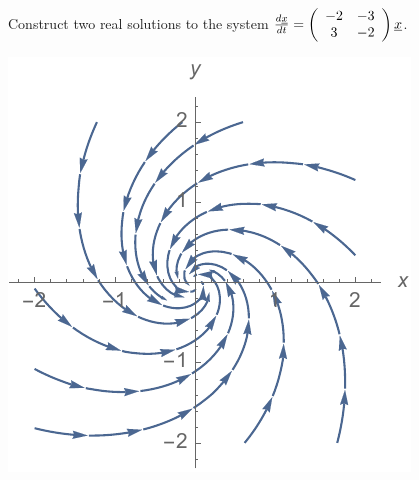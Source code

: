 \documentclass[12pt,letterpaper,noanswers]{exam}
\begin{document}
Construct two real solutions to the system $\frac{d\underline{x}}{dt} = \left(\begin{array}{c c}-2 & -3 \\ 3 & -2\end{array}\right)\underline{x}$.

\includegraphics{img/C36phase.pdf}
\end{document}
